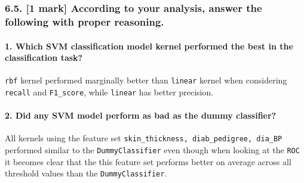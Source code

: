 \documentclass[11pt]{article}
\begin{document}
    \begin{center}
    \end{center}
    { \hspace*{\fill} \\}
    
    \begin{center}
    \end{center}
    { \hspace*{\fill} \\}
    
    \hypertarget{mark-according-to-your-analysis-answer-the-following-with-proper-reasoning.}{%
\subsubsection{6.5. {[}1 mark{]} According to your analysis, answer the
following with proper
reasoning.}\label{mark-according-to-your-analysis-answer-the-following-with-proper-reasoning.}}

\hypertarget{which-svm-classification-model-kernel-performed-the-best-in-the-classification-task}{%
\paragraph{1. Which SVM classification model kernel performed the best
in the classification
task?}\label{which-svm-classification-model-kernel-performed-the-best-in-the-classification-task}}

\texttt{rbf} kernel performed marginally better than \texttt{linear}
kernel when considering \texttt{recall} and \texttt{F1\_score}, while
\texttt{linear} has better precision.

\hypertarget{did-any-svm-model-perform-as-bad-as-the-dummy-classifier}{%
\paragraph{2. Did any SVM model perform as bad as the dummy
classifier?}\label{did-any-svm-model-perform-as-bad-as-the-dummy-classifier}}

All kernels using the feature set
\texttt{skin\_thickness,\ diab\_pedigree,\ dia\_BP} performed similar to
the \texttt{DummyClassifier} even though when looking at the
\texttt{ROC} it becomes clear that the this feature set performs better
on average across all threshold values than the
\texttt{DummyClassifier}.
\end{document}
